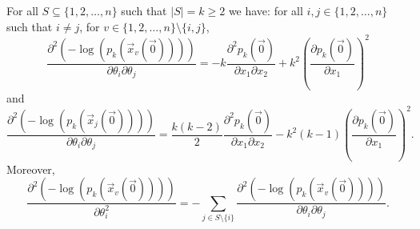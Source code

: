 \begin{lemma} For all $S\subseteq \{1,2,\ldots,n\}$ such that $|S| = k\geq 2$ we have: for all $i,j\in \{1,2,\ldots,n\}$ such that $i\neq j$, for $v \in \{1,2,\ldots,n\} \setminus \{i,j\}$, 
\begin{equation}
\frac{\partial^2 (-\log(p_k(\vec{x}_v(\vec{0}))))}{\partial \theta_i \partial \theta_j} 
= - k\frac{\partial^2 p_k(\vec{0})}{\partial x_1 \partial x_2}
 + k^2 \left(\frac{\partial p_k(\vec{0})}{\partial x_1}\right)^2
\label{equ:case1}
\end{equation}
and
\begin{equation}
\frac{\partial^2 (-\log(p_k(\vec{x}_j(\vec{0}))))}{\partial \theta_i \partial \theta_j} = \frac{k(k-2)}{2}\frac{\partial^2 p_k(\vec{0})}{\partial x_1 \partial x_2} - k^2(k-1)\left(\frac{\partial p_k(\vec{0})}{\partial x_1}\right)^2.
\label{equ:case2}
\end{equation}
Moreover,
\begin{equation}
\frac{\partial^2 (-\log(p_k(\vec{x}_v(\vec{0}))))}{\partial \theta_i^2} = - \sum_{j\in S\setminus \{i\}} \frac{\partial^2 (-\log(p_k(\vec{x}_v(\vec{0}))))}{\partial \theta_i \partial \theta_j}.
\label{equ:diff2i}
\end{equation}
\label{lem:partiallogs}
\end{lemma}

